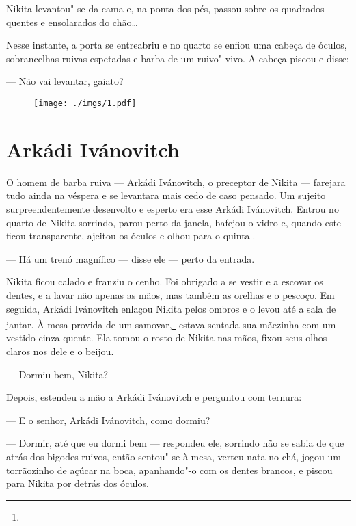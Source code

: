 Nikita levantou"-se da cama e, na ponta dos pés, passou sobre os
quadrados quentes e ensolarados do chão\ldots{}

Nesse instante, a porta se entreabriu e no quarto se enfiou uma cabeça
de óculos, sobrancelhas ruivas espetadas e barba de um ruivo"-vivo. A
cabeça piscou e disse:

--- Não vai levantar, gaiato?

\begin{figure}
\vspace*{-2.1cm}
\hspace*{-2.5cm}\texttt{[image: ./imgs/1.pdf]}
\end{figure}

\chapter{Arkádi Ivánovitch}

O homem de barba ruiva --- Arkádi Ivánovitch, o preceptor de Nikita ---
farejara tudo ainda na véspera e se levantara mais cedo de caso pensado.
Um sujeito surpreendentemente desenvolto e esperto era esse Arkádi
Ivánovitch. Entrou no quarto de Nikita sorrindo, parou perto da janela,
bafejou o vidro e, quando este ficou transparente, ajeitou os óculos e
olhou para o quintal.

--- Há um trenó magnífico --- disse ele --- perto da entrada.

Nikita ficou calado e franziu o cenho. Foi obrigado a se vestir e a
escovar os dentes, e a lavar não apenas as mãos, mas também as orelhas e
o pescoço. Em seguida, Arkádi Ivánovitch enlaçou Nikita pelos ombros e o
levou até a sala de jantar. À mesa provida de um samovar,\footnote{} estava sentada
sua mãezinha com um vestido cinza quente. Ela tomou o rosto de Nikita
nas mãos, fixou seus olhos claros nos dele e o beijou.

--- Dormiu bem, Nikita?

Depois, estendeu a mão a Arkádi Ivánovitch e perguntou com ternura:

--- E o senhor, Arkádi Ivánovitch, como dormiu?

--- Dormir, até que eu dormi bem --- respondeu ele, sorrindo não se sabia
de que atrás dos bigodes ruivos, então sentou"-se à mesa, verteu nata no chá,
jogou um torrãozinho de açúcar na boca, apanhando"-o com os dentes brancos,
e piscou para Nikita por detrás dos óculos.

